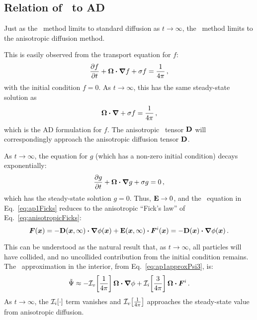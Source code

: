 \subsection{Relation of \APone\ to AD}
Just as the \Pone\ method limits to standard diffusion as $t\to\infty$, the
\APone\ method limits to the anisotropic diffusion method.

This is easily observed from the transport equation for $f$:
\begin{equation*}
  \frac{\partial f}{\partial t} + \bm{\Omega}\bm{\cdot} \bm{\nabla} f + \sigma f = \frac{1}{4\pi}\,,
\end{equation*}
with the initial condition $f=0$. As $t\to\infty$, this has the same
steady-state solution as
\begin{equation*}
  \bm{\Omega}\bm{\cdot} \bm{\nabla} + \sigma f = \frac{1}{4\pi}\,,
\end{equation*}
which is the AD formulation for $f$. The anisotropic \Pone\ tensor $\mathbf{D}$
will correspondingly approach the anisotropic diffusion tensor $\mathbf{D}$.

As $t\to\infty$, the equation for $g$ (which has a non-zero initial condition)
decays exponentially:
\begin{equation*}
  \frac{\partial g}{\partial t} + \bm{\Omega}\bm{\cdot} \bm{\nabla} g + \sigma g = 0 \,,
\end{equation*}
which has the steady-state solution $g=0$. Thus, $\mathbf{E}\to 0$, and the \APone\
equation in Eq.~\eqref{eq:ap1Ficks} reduces to the anisotropic ``Fick's law''
of Eq.~\eqref{eq:anisotropicFicks}:
\begin{equation*}
  \bm{F}(\bm{x})
= - \mathbf{D}(\bm{x},\infty) \bm{\cdot} \bm{\nabla} \phi(\bm{x})
  + \mathbf{E}(\bm{x},\infty) \bm{\cdot} \bm{F}^i(\bm{x})
  = - \mathbf{D}(\bm{x}) \bm{\cdot} \bm{\nabla} \phi(\bm{x})\,.
\end{equation*}

This can be understood as the natural result that, as $t\to\infty$, all
particles will have collided, and no uncollided contribution from the initial
condition remains.  The \APone\ approximation in the interior, from
Eq.~\eqref{eq:ap1approxPsi3}, is:
\begin{equation*}
 \tilde\Psi
 \approx 
 - \mathcal{I}_{v}\!\left[\frac{1}{4\pi}\right] \bm{\Omega}\bm{\cdot} \bm{\nabla} \phi
 + \mathcal{I}_{i}\!\left[\frac{3}{4\pi}\right] \bm{\Omega}\bm{\cdot} \bm{F}^i \,.
\end{equation*}
As $t\to\infty$, the $\mathcal{I}_{i}\!\left[\cdot\right]$ term vanishes and
$\mathcal{I}_{v}\!\left[\frac{1}{4\pi}\right]$ approaches the steady-state value from anisotropic
diffusion.

